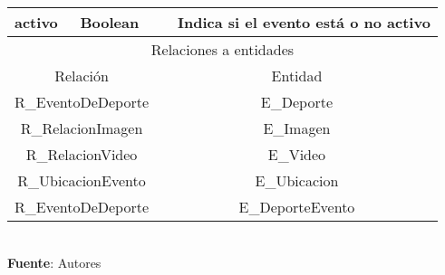 \begin{table}[!htb]
\begin{center}
{\begin{tabular}{|p{4cm}|p{4cm}|p{4cm}|p{8cm}|}
			activo &
			Boolean &
			&
			Indica si el evento está o no activo \\
			\hline
			\multicolumn{4}{|c|}{Relaciones a entidades} \\
			\hline
			\multicolumn{2}{|c|}{Relación} & \multicolumn{2}{c|}{Entidad} \\
			\hline
			\multicolumn{2}{|c|}{R\_EventoDeDeporte} & 
			\multicolumn{2}{c|}{E\_Deporte} \\
			\hline
			\multicolumn{2}{|c|}{R\_RelacionImagen} & 
			\multicolumn{2}{c|}{E\_Imagen} \\
			\hline
			\multicolumn{2}{|c|}{R\_RelacionVideo} & 
			\multicolumn{2}{c|}{E\_Video} \\
			\hline
			\multicolumn{2}{|c|}{R\_UbicacionEvento} & 
			\multicolumn{2}{c|}{E\_Ubicacion} \\
			\hline
			\multicolumn{2}{|c|}{R\_EventoDeDeporte} & 
			\multicolumn{2}{c|}{E\_DeporteEvento} \\
			\hline
		\end{tabular}
		} \\
		\textbf{Fuente}: Autores
	\end{center}
\end{table}
